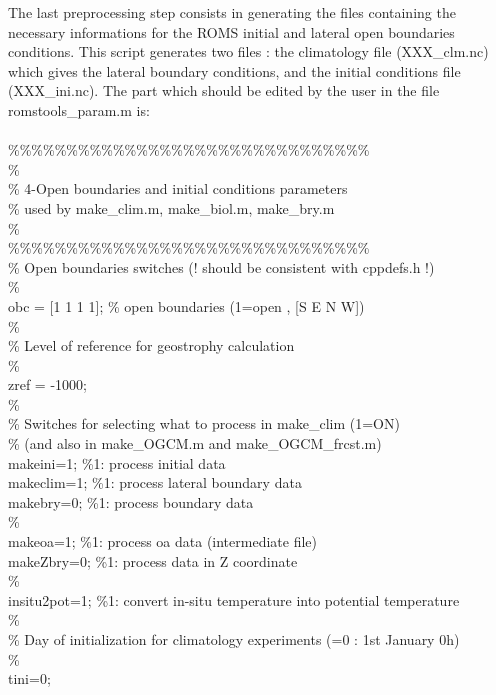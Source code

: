 The last preprocessing step consists in generating the files containing 
the necessary informations for the ROMS initial and lateral open boundaries 
conditions.
This script generates two files : the climatology file (XXX\_clm.nc) which gives 
the lateral boundary conditions, and the initial conditions file (XXX\_ini.nc).
The part which should be edited by the user in the file romstools\_param.m is:
\\ \\
\%\%\%\%\%\%\%\%\%\%\%\%\%\%\%\%\%\%\%\%\%\%\%\%\%\%\%\%\%\%\%\\
\%\\
\% 4-Open boundaries and initial conditions parameters\\
\%   used by make\_clim.m, make\_biol.m, make\_bry.m\\
\%\\
\%\%\%\%\%\%\%\%\%\%\%\%\%\%\%\%\%\%\%\%\%\%\%\%\%\%\%\%\%\%\%\\
\%  Open boundaries switches (! should be consistent with cppdefs.h !)\\
\%\\
obc = [1 1 1 1]; \% open boundaries (1=open , [S E N W])\\
\%\\
\%  Level of reference for geostrophy calculation\\
\%\\
zref = -1000;\\
\%\\
\%  Switches for selecting what to process in make\_clim (1=ON)\\
\%  (and also in make\_OGCM.m and make\_OGCM\_frcst.m)\\
makeini=1;      \%1: process initial data\\
makeclim=1;     \%1: process lateral boundary data\\
makebry=0;      \%1: process boundary data\\
\%\\
makeoa=1;       \%1: process oa data (intermediate file)\\
makeZbry=0;     \%1: process data in Z coordinate\\
\%\\
insitu2pot=1;   \%1: convert in-situ temperature into potential temperature\\
\%\\
\%  Day of initialization for climatology experiments (=0 : 1st January 0h)\\
\%\\
tini=0;\\  
